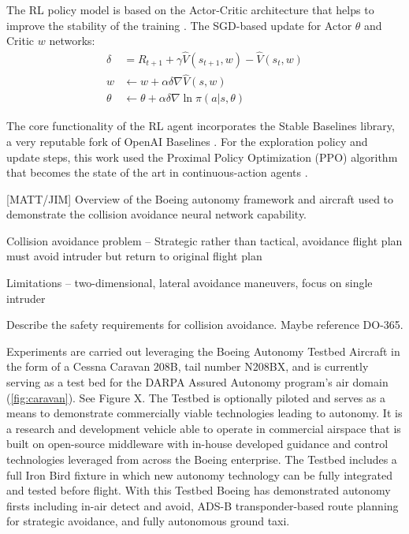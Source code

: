 The RL policy model is based on the Actor-Critic architecture that helps to improve the stability of the training \cite{sutton2018reinforcement}. The SGD-based update for Actor $\theta$ and Critic $w$ networks:
\begin{align}
	\delta &=  R_{t+1} +\gamma \hat V(s_{t+1},w) - \hat V(s_t,w) \\
	w &\leftarrow w + \alpha \delta \nabla \hat V (s, w) \\
	\theta &\leftarrow \theta + \alpha \delta \nabla \ln \pi (a|s, \theta)
\end{align} 

The core functionality of the RL agent incorporates the Stable Baselines library, a very reputable fork of OpenAI Baselines \cite{hill2018stable}. For the exploration policy and update steps, this work used the Proximal Policy Optimization (PPO) algorithm that becomes the state of the art in continuous-action agents \cite{schulman2017proximal}.

[MATT/JIM] Overview of the Boeing autonomy framework and aircraft used to demonstrate the collision avoidance neural network capability.

Collision avoidance problem -- Strategic rather than tactical, avoidance flight plan must avoid intruder but return to original flight plan

Limitations --  two-dimensional, lateral avoidance maneuvers, focus on single intruder

Describe the safety requirements for collision avoidance.  Maybe reference DO-365. 

Experiments are carried out leveraging the Boeing Autonomy Testbed Aircraft in the form of a Cessna Caravan 208B, tail number N208BX, and is currently serving as a test bed for the DARPA Assured Autonomy program’s air domain (\ref{fig:caravan}).  See Figure X.  The Testbed is optionally piloted and serves as a means to demonstrate commercially viable technologies leading to autonomy.  It is a research and development vehicle able to operate in commercial airspace that is built on open-source middleware with in-house developed guidance and control technologies leveraged from across the Boeing enterprise.  The Testbed includes a full Iron Bird fixture in which new autonomy technology can be fully integrated and tested before flight.  With this Testbed Boeing has demonstrated autonomy firsts including in-air detect and avoid, ADS-B transponder-based route planning for strategic avoidance, and fully autonomous ground taxi.

